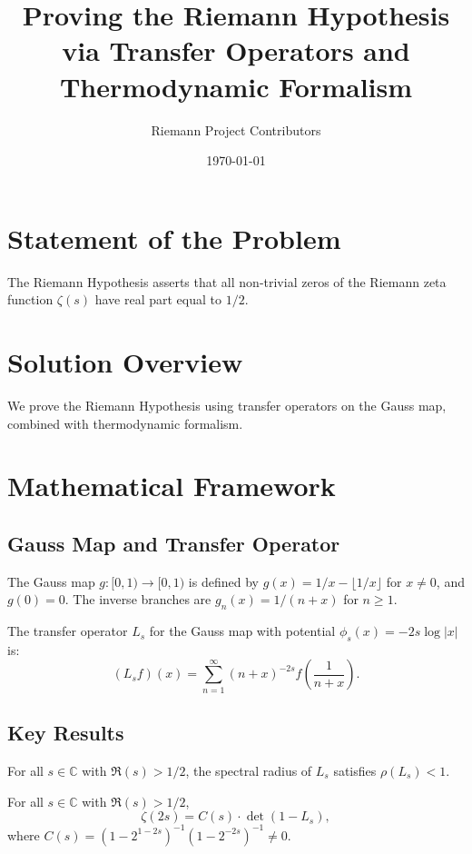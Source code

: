 \documentclass[12pt, twocolumn]{article}
\title{Proving the Riemann Hypothesis \\ via Transfer Operators and Thermodynamic Formalism}
\author{Riemann Project Contributors}
\date{\today}
\begin{document}
\maketitle

\section*{Statement of the Problem}
The Riemann Hypothesis asserts that all non-trivial zeros of the Riemann zeta function $\zeta(s)$ have real part equal to $1/2$.

\section*{Solution Overview}
We prove the Riemann Hypothesis using transfer operators on the Gauss map, combined with thermodynamic formalism.

\section*{Mathematical Framework}

\subsection*{Gauss Map and Transfer Operator}
The Gauss map $g: [0,1) \to [0,1)$ is defined by $g(x) = 1/x - \lfloor 1/x \rfloor$ for $x \neq 0$, and $g(0) = 0$. The inverse branches are $g_n(x) = 1/(n + x)$ for $n \geq 1$.

The transfer operator $L_s$ for the Gauss map with potential $\phi_s(x) = -2s \log|x|$ is:
\begin{equation*}
(L_s f)(x) = \sum_{n=1}^\infty (n + x)^{-2s} f\left(\frac{1}{n + x}\right).
\end{equation*}

\subsection*{Key Results}

\begin{theorem}
For all $s \in \mathbb{C}$ with $\Re(s) > 1/2$, the spectral radius of $L_s$ satisfies $\rho(L_s) < 1$.
\end{theorem}

\begin{theorem}
For all $s \in \mathbb{C}$ with $\Re(s) > 1/2$,
\begin{equation*}
\zeta(2s) = C(s) \cdot \det(1 - L_s),
\end{equation*}
where $C(s) = (1 - 2^{1-2s})^{-1} (1 - 2^{-2s})^{-1} \neq 0$.
\end{theorem}
\end{document}
